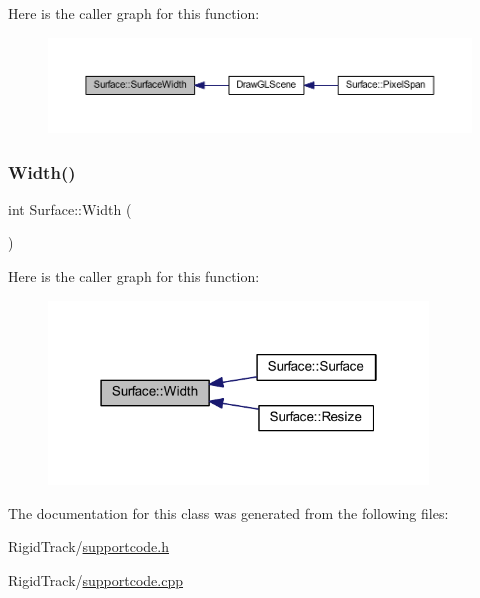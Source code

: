 Here is the caller graph for this function\+:\nopagebreak
\begin{figure}[H]
\begin{center}
\leavevmode
\includegraphics[width=350pt]{class_surface_a4cbf23ea0c8ff533271109fc2a1a863d_icgraph}
\end{center}
\end{figure}
\mbox{\label{class_surface_ae76d7c2fa208df6979a77cc60e8105c0}} 
\subsubsection{\texorpdfstring{Width()}{Width()}}
{\footnotesize\ttfamily int Surface\+::\+Width (\begin{DoxyParamCaption}{ }\end{DoxyParamCaption})\hspace{0.3cm}{\ttfamily [inline]}}

Here is the caller graph for this function\+:\nopagebreak
\begin{figure}[H]
\begin{center}
\leavevmode
\includegraphics[width=286pt]{class_surface_ae76d7c2fa208df6979a77cc60e8105c0_icgraph}
\end{center}
\end{figure}


The documentation for this class was generated from the following files\+:\begin{DoxyCompactItemize}
\item 
Rigid\+Track/\hyperlink{supportcode_8h}{supportcode.\+h}\item 
Rigid\+Track/\hyperlink{supportcode_8cpp}{supportcode.\+cpp}\end{DoxyCompactItemize}
